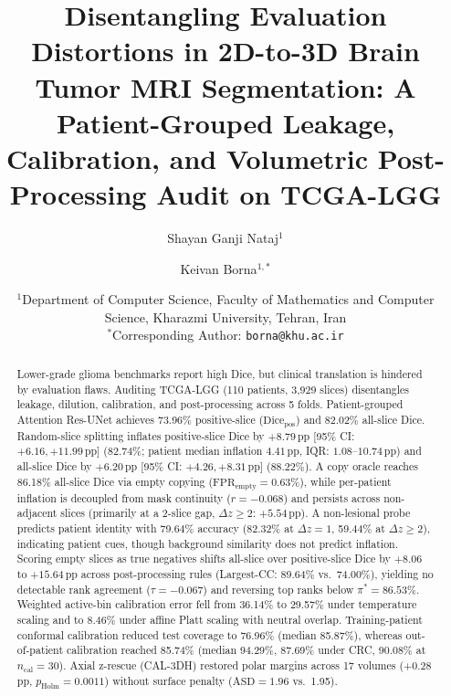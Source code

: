 \documentclass[11pt,a4paper]{article}
\begin{document}
\title{\LARGE \textbf{Disentangling Evaluation Distortions in 2D-to-3D Brain Tumor MRI Segmentation: A Patient-Grouped Leakage, Calibration, and Volumetric Post-Processing Audit on TCGA-LGG}}

\author{Shayan Ganji Nataj$^{1}$ \and Keivan Borna$^{1,*}$}

\date{\small $^{1}$Department of Computer Science, Faculty of Mathematics and Computer Science, Kharazmi University, Tehran, Iran\\[0.3em]
$^{*}$Corresponding Author: \texttt{borna@khu.ac.ir}}

\maketitle

\begin{abstract}
Lower-grade glioma benchmarks report high Dice, but clinical translation is hindered by evaluation flaws. Auditing TCGA-LGG (110 patients, 3,929 slices) disentangles leakage, dilution, calibration, and post-processing across 5 folds. Patient-grouped Attention Res-UNet achieves 73.96\% positive-slice ($\text{Dice}_{\text{pos}}$) and 82.02\% all-slice Dice. Random-slice splitting inflates positive-slice Dice by $+8.79\,\text{pp}$ [95\% CI: $+6.16, +11.99\,\text{pp}$] (82.74\%; patient median inflation $4.41\,\text{pp}$, IQR: $1.08$--$10.74\,\text{pp}$) and all-slice Dice by $+6.20\,\text{pp}$ [95\% CI: $+4.26, +8.31\,\text{pp}$] ($88.22\%$). A copy oracle reaches 86.18\% all-slice Dice via empty copying ($\text{FPR}_{\text{empty}} = 0.63\%$), while per-patient inflation is decoupled from mask continuity ($r = -0.068$) and persists across non-adjacent slices (primarily at a 2-slice gap, $\Delta z \ge 2$: $+5.54\,\text{pp}$). A non-lesional probe predicts patient identity with 79.64\% accuracy (82.32\% at $\Delta z = 1$, 59.44\% at $\Delta z \ge 2$), indicating patient cues, though background similarity does not predict inflation. Scoring empty slices as true negatives shifts all-slice over positive-slice Dice by $+8.06$ to $+15.64\,\text{pp}$ across post-processing rules (Largest-CC: 89.64\% vs.\ 74.00\%), yielding no detectable rank agreement ($\tau = -0.067$) and reversing top ranks below $\pi^* = 86.53\%$. Weighted active-bin calibration error fell from 36.14\% to 29.57\% under temperature scaling and to 8.46\% under affine Platt scaling with neutral overlap. Training-patient conformal calibration reduced test coverage to 76.96\% (median 85.87\%), whereas out-of-patient calibration reached 85.74\% (median 94.29\%, 87.69\% under CRC, 90.08\% at $n_{\text{cal}} = 30$). Axial z-rescue (CAL-3DH) restored polar margins across 17 volumes (+0.28 pp, $p_{\text{Holm}} = 0.0011$) without surface penalty ($\text{ASD} = 1.96$ vs.\ 1.95).
\end{abstract}
\end{document}
